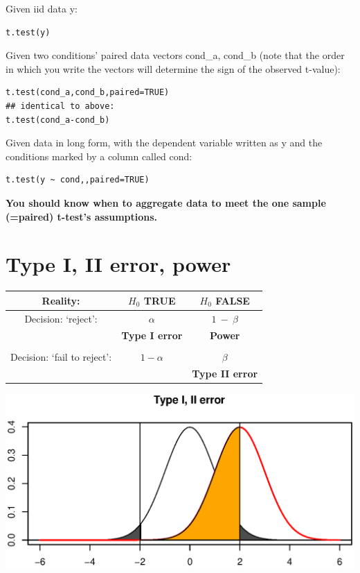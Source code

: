 \documentclass[12pt]{article}
\begin{document}
Given iid data y:

\begin{verbatim}
t.test(y)
\end{verbatim}

Given two conditions' paired data vectors cond\_a, cond\_b (note that the order in which you write the vectors will determine the sign of the observed t-value):

\begin{verbatim}
t.test(cond_a,cond_b,paired=TRUE)
## identical to above:
t.test(cond_a-cond_b)
\end{verbatim}

Given data in long form, with the dependent variable written as y and the conditions marked by a column called cond:

\begin{verbatim}
t.test(y ~ cond,,paired=TRUE)
\end{verbatim}

\textbf{You should know when to aggregate data to meet the one sample (=paired) t-test's assumptions.}

\section{Type I, II error, power}

\begin{tabular}{ccc}
\hline
Reality: & $H_0$ TRUE & $H_0$ FALSE \\
\hline
Decision: `reject': & $\alpha$ & $1~-~\beta$ \\
                                     & \textbf{Type I error}                         & \textbf{Power} \\                                      
                                     & & \\
\hline
Decision: `fail to reject': & $1 - \alpha$ & $\beta$ \\                                    &                                 & \textbf{Type II error}\\
\hline
\end{tabular}

{\centering \includegraphics{figures/figure-unnamed-chunk-1-1} 
}
\end{document}
